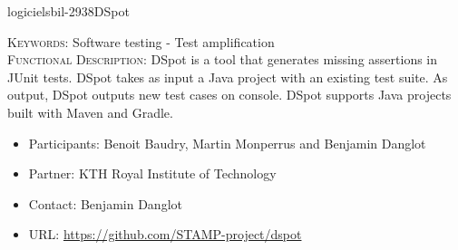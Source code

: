 \documentclass{ra2018}
\begin{document}
 \begin{module}{logiciels}{bil-2938}{DSpot}

   \textsc{Keywords:} Software testing - Test amplification \\ 


   

 \textsc{Functional Description:}  DSpot is a tool that generates missing assertions in JUnit tests. DSpot takes as input a Java project with an existing test suite. As output, DSpot outputs new test cases on console. DSpot supports Java projects built with Maven and Gradle.\\

   \begin{itemize}
      \item Participants: Benoit Baudry, Martin Monperrus and Benjamin Danglot
      \item Partner: KTH Royal Institute of Technology
      \item Contact: Benjamin Danglot
      \item URL: \url{https://github.com/STAMP-project/dspot}
   \end{itemize}

 \end{module}
\end{document}
